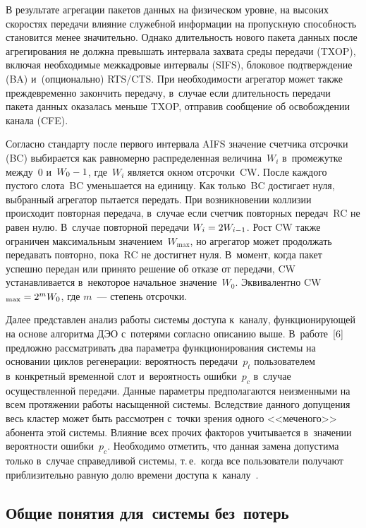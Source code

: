 \begin{multicols}{2}
    В результате агрегации пакетов данных на физическом уровне, на 
высоких скоростях передачи влияние служебной информации на 
пропускную способность становится менее значительно. Однако 
длительность нового пакета данных после агрегирования не должна 
превышать интервала захва\-та среды передачи (TXOP), включая 
необходимые межкадровые интервалы (SIFS), блоковое под\-тверж\-де\-ние 
(BA) и~(опционально) RTS/CTS. При не\-об\-хо\-ди\-мости агрегатор может 
также преждевременно закончить передачу, в~случае если длительность 
передачи пакета данных оказалась меньше TXOP, отправив сообщение об 
освобождении канала (CFE).
    
    Согласно стандарту после первого интервала AIFS значение 
счетчика отсрочки (BC) выбирается как равномерно распределенная 
величина~$W_i$ в~промежутке между~0 и~$W_0\hm-1$, где~$W_i$ 
является окном отсрочки~CW. После каждого пустого слота~BC 
уменьшается на единицу. Как только~BC достигает нуля, выбранный 
агрегатор пытается передать. При возникновении коллизии происходит 
повторная передача, в~случае если счетчик повторных передач~RC не 
равен нулю. В~случае повторной передачи $W_i\hm= 2W_{i-1}$. Рост 
CW также ограничен максимальным значением~$W_{\max}$, но 
агрегатор может продолжать передавать повторно, пока~RC не 
достигнет нуля. В~момент, когда пакет успешно передан или принято 
решение об отказе от передачи, CW устанавливается в~некоторое 
начальное значение~$W_0$. Эквивалентно CW$_{\max}\hm= 2^m W_0$, 
где $m$~--- степень отсрочки.
    
    Далее представлен анализ работы системы доступа к~каналу, 
функционирующей на основе алгоритма ДЭО с~потерями согласно 
описанию выше. В~работе~[6] предложно рассматривать два параметра 
функционирования системы на основании циклов регенерации: 
вероятность передачи~$p_t$ пользователем в~конкретный временной слот 
и~вероятность ошибки~$p_c$ в~случае осуществленной передачи. 
Данные параметры предполагаются неизменными на всем протяжении 
работы насыщенной системы. Вследствие данного допущения весь 
кластер может быть рассмотрен с~точки зрения одного <<меченого>> 
абонента этой системы. Влияние всех прочих факторов учитывается 
в~значении вероятности ошибки~$p_c$. Необходимо отметить, что 
данная замена допустима только в~случае справедливой системы, т.\,е.\ 
когда все пользователи получают приблизительно равную долю времени 
доступа к~каналу~\cite{7-om}.

    
\subsection{Общие понятия для~системы без~потерь}
    

\end{multicols}
